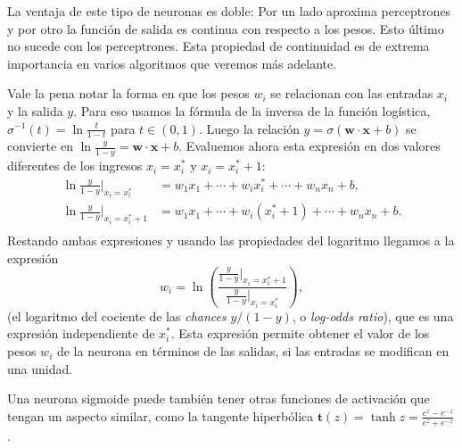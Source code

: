\documentclass[12pt, a4paper]{amsbook}
\newcommand{\tb}{{\mathbf t}}
\newcommand{\ww}{{\mathbf w}}
\newcommand{\xx}{{\mathbf x}}
\theoremstyle{remark}
\theoremstyle{definition}
\numberwithin{section}{chapter}
\numberwithin{subsection}{section}
\numberwithin{equation}{section}
\numberwithin{figure}{chapter}
\begin{document}
La ventaja de este tipo de neuronas es doble: Por un lado aproxima perceptrones y por otro la función de salida es continua con respecto a los pesos. Esto último no sucede con los perceptrones. Esta propiedad de continuidad es de extrema importancia en varios algoritmos que veremos más adelante.

Vale la pena notar la forma en que los pesos $w_i$ se relacionan con las entradas $x_i$ y la salida $y$. Para eso usamos la fórmula de la inversa de la función logística, $\sigma^{-1}(t) = \ln\tfrac{t}{1-t}$ para $t\in(0,1)$. Luego la relación $y=\sigma(\ww\cdot\xx + b)$ se convierte en $\ln\tfrac{y}{1-y} = \ww\cdot\xx + b$. Evaluemos ahora esta expresión en dos valores diferentes de los ingresos $x_i = x_i^*$ y $x_i=x_i^*+1$:
\begin{align*}
\ln\frac{y}{1-y} |_{x_i=x_i^*} & = w_1 x_1 + \cdots + w_i x_i^* + \cdots + w_n x_n + b,\\
\ln\frac{y}{1-y} |_{x_i=x_i^*+1} & = w_1 x_1 + \cdots + w_i (x_i^*+1) + \cdots + w_n x_n + b.\\
\end{align*}
Restando ambas expresiones y usando las propiedades del logaritmo llegamos a la expresión
$$
w_i = \ln\left(\frac{\frac{y}{1-y}|_{x_i=x_i^*+1}}{\frac{y}{1-y}|_{x_i=x_i^*}}\right),
$$
(el logaritmo del cociente de las {\em chances} $y/(1-y)$, o {\em log-odds ratio}), que es una expresión independiente de $x_i^*$. Esta expresión permite obtener el valor de los pesos $w_i$ de la neurona en términos de las salidas, si las entradas  se modifican en una unidad.

Una neurona sigmoide puede también tener otras funciones de activación que tengan un aspecto similar, como la tangente hiperbólica $\tb(z) = \tanh z = \tfrac{e^z - e^{-z}}{e^z + e^{-z}}$.
\end{document}
